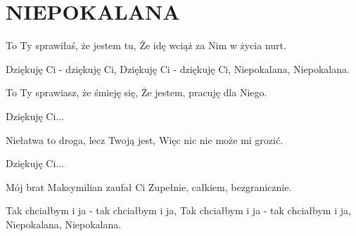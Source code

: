 \documentclass[../../../songbook.tex]{subfiles}
\begin{document}
\TabPositions{8cm} %
\section*{NIEPOKALANA}
\vspace{0.5cm}
To Ty sprawiłaś, że jestem tu,		 \newline
Że idę wciąż za Nim w życia nurt.	  \newline

\-\hspace{1cm} Dziękuję Ci - dziękuję Ci,	 \newline
\-\hspace{1cm} Dziękuję Ci - dziękuję Ci,	 \newline
\-\hspace{1cm} Niepokalana, Niepokalana.	 \newline

To Ty sprawiasz, że śmieję się, \newline
Że jestem, pracuję dla Niego. \newline

\-\hspace{1cm} Dziękuję Ci... \newline

Niełatwa to droga, lecz Twoją jest, \newline
Więc nic nie może mi grozić. \newline

\-\hspace{1cm} Dziękuję Ci... \newline

Mój brat Maksymilian zaufał Ci \newline
Zupełnie, całkiem, bezgranicznie. \newline

\-\hspace{1cm} Tak chciałbym i ja - tak chciałbym i ja, \newline
\-\hspace{1cm} Tak chciałbym i ja - tak chciałbym i ja, \newline
\-\hspace{1cm} Niepokalana, Niepokalana. \newline
\end{document}
